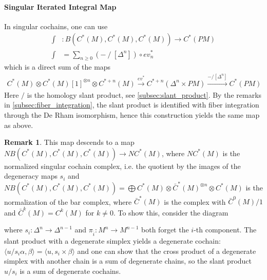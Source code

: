 \documentclass{scrartcl}
\theoremstyle{plain}
\theoremstyle{definition}
\newtheorem{remark}[theorem]{Remark}
\newcommand{\slant}{\mathbin{/}}
\let\xto\xrightarrow
\DeclareMathOperator{\id}{id}
\newcommand{\blank}{-}
\newcommand{\comp}{\mathbin{\circ}}
\begin{document}
\paragraph{Singular Iterated Integral Map} In singular cochains, one can use
\begin{align*}
    \int&\colon B(C^*(M), C^*(M), C^*(M)) \to C^*(PM) \\
    \int&= \sum_{n\geq 0} (\blank \slant [\Delta^n]) \comp ev_n^*
\end{align*}
which is a direct sum of the maps 
\begin{align*}
    C^*(M)\otimes C^*(M)[1]^{\otimes n} \otimes C^{*+n}(M) \xto{ev^*} C^{*+n}(\Delta^n\times PM) \xto{\blank / [\Delta^n]} C^{*}(PM)
\end{align*}
Here $/$ is the homology slant product, see \ref{subsec:slant_product}. By the remarks in \ref{subsec:fiber_integration}, the slant product is identified with fiber integration through the De Rham isomorphism, hence this construction yields the same map as above.

\begin{remark}
    This map descends to a map $NB(C^*(M), C^*(M), C^*(M)) \to NC^*(M)$, where $NC^*(M)$ is the normalized singular cochain complex, i.e. the quotient by the images of the degeneracy maps $s_i$ and  $NB(C^*(M), C^*(M), C^*(M)) = \bigoplus C^*(M)\otimes \bar C^*(M)^{\otimes n}\otimes C^*(M)$ is the normalization of the bar complex, where $\bar C^*(M)$ is the complex with $\bar C^0(M) / 1$ and $\bar C^k(M) = C^k(M)$ for $k\neq 0$. To show this, consider the diagram


    where $s_i\colon\Delta^n\to\Delta^{n-1}$ and $\pi_{\hat i}\colon M^{n}\to M^{n-1}$ both forget the $i$-th component. The slant product with a degenerate simplex yields a degenerate cochain: $\langle u / s_i\alpha, \beta\rangle = \langle u,s_i\times\beta\rangle$ and one can show that the cross product of a degenerate simplex with another chain is a sum of degenerate chains, so the slant product $u/s_i$ is a sum of degenerate cochains. 
\end{remark}
\end{document}
